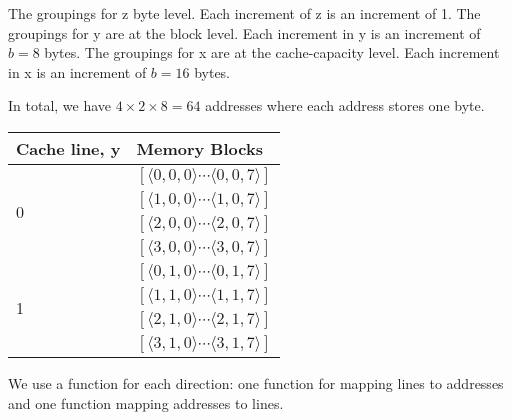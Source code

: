 \begin{example}
\begin{tikzpicture}[
      start chain=1 going right,
      node distance=0mm,
      addr/.style={draw, on chain=1, minimum height=1cm,
      text centered, text width=0.1em, inner sep=1.7pt}
  ]
\end{tikzpicture}

The groupings for z byte level. Each increment of z is an increment of 1. 
The groupings for y are at the block level. Each increment in y is an 
increment of $b = 8$ bytes. The groupings for x are at the cache-capacity level. 
Each increment in x is an increment of $b = 16$ bytes. 

In total, we have $4 \times 2 \times 8 = 64$ addresses where each address 
stores one byte. 

\end{example}


\begin{center}
  \begin{tabular}{ |l|l| }
    \hline
    Cache line, y & Memory Blocks \\ 
    \hline
    \multirow{4}{*}{0} 
     & $[\langle 0,0,0 \rangle \dotsm \langle 0,0,7 \rangle]$ \\
     & $[\langle 1,0,0 \rangle \dotsm \langle 1,0,7 \rangle]$ \\
     & $[\langle 2,0,0 \rangle \dotsm \langle 2,0,7 \rangle]$ \\
     & $[\langle 3,0,0 \rangle \dotsm \langle 3,0,7 \rangle]$ \\ 
    \hline
    \multirow{4}{*}{1}
     & $[\langle 0,1,0 \rangle \dotsm \langle 0,1,7 \rangle]$ \\
     & $[\langle 1,1,0 \rangle \dotsm \langle 1,1,7 \rangle]$ \\
     & $[\langle 2,1,0 \rangle \dotsm \langle 2,1,7 \rangle]$ \\
     & $[\langle 3,1,0 \rangle \dotsm \langle 3,1,7 \rangle]$ \\ 
    \hline
  \end{tabular}
\end{center}




\frmrule

We use a function for each direction: one function for 
mapping lines to addresses and one function mapping addresses to lines. 

